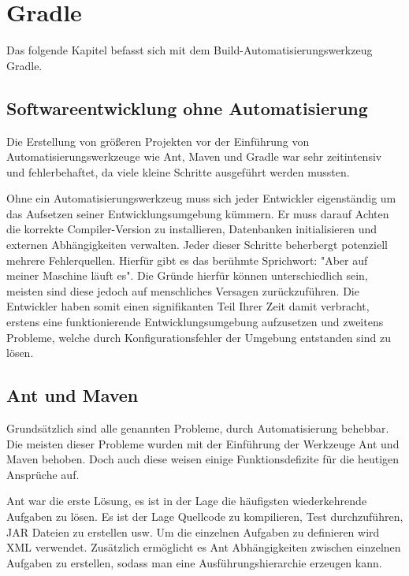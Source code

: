 
\section{Gradle}

Das folgende Kapitel befasst sich mit dem Build-Automatisierungswerkzeug Gradle.


\subsection{Softwareentwicklung ohne Automatisierung}

Die Erstellung von größeren Projekten vor der Einführung von Automatisierungswerkzeuge wie Ant, Maven und Gradle war sehr zeitintensiv und fehlerbehaftet, da viele kleine Schritte ausgeführt werden mussten.

Ohne ein Automatisierungswerkzeug muss sich jeder Entwickler eigenständig um das Aufsetzen seiner Entwicklungsumgebung kümmern. 
Er muss darauf Achten die korrekte Compiler-Version zu installieren, Datenbanken initialisieren und externen Abhängigkeiten verwalten.
Jeder dieser Schritte beherbergt potenziell mehrere Fehlerquellen.
Hierfür gibt es das berühmte Sprichwort: "Aber auf meiner Maschine läuft es".
Die Gründe hierfür können unterschiedlich sein, meisten sind diese jedoch auf menschliches Versagen zurückzuführen.
Die Entwickler haben somit einen signifikanten Teil Ihrer Zeit damit verbracht, erstens eine funktionierende Entwicklungsumgebung aufzusetzen und zweitens Probleme, welche durch Konfigurationsfehler der Umgebung entstanden sind zu lösen.

\subsection{Ant und Maven}

Grundsätzlich sind alle genannten Probleme, durch Automatisierung behebbar.
Die meisten dieser Probleme wurden mit der Einführung der Werkzeuge Ant und Maven behoben.
Doch auch diese weisen einige Funktionsdefizite für die heutigen Ansprüche auf. 

Ant war die erste Lösung, es ist in der Lage die häufigsten wiederkehrende Aufgaben zu lösen.
Es ist der Lage Quellcode zu kompilieren, Test durchzuführen, JAR Dateien zu erstellen usw.
Um die einzelnen Aufgaben zu definieren wird XML verwendet.
Zusätzlich ermöglicht es Ant Abhängigkeiten zwischen einzelnen Aufgaben zu erstellen, sodass man eine Ausführungshierarchie erzeugen kann.

